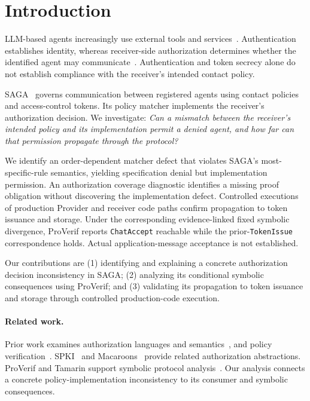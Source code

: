 \section{Introduction}
\label{sec:introduction}

LLM-based agents increasingly use external tools and
services~\cite{wang2024agents,debenedetti2024agentdojo}.
Authentication establishes identity, whereas receiver-side
authorization determines whether the identified agent may
communicate~\cite{ellison1999spki}. Authentication and token
secrecy alone do not establish compliance with the receiver's
intended contact policy.

SAGA~\cite{syros2025saga} governs communication between
registered agents using contact policies and access-control
tokens. Its policy matcher implements the receiver's
authorization decision. We investigate:
\emph{Can a mismatch between the receiver's intended policy
and its implementation permit a denied agent, and how far
can that permission propagate through the protocol?}

We identify an order-dependent matcher defect that violates
SAGA's most-specific-rule semantics, yielding specification
denial but implementation permission. An authorization
coverage diagnostic identifies a missing proof obligation
without discovering the implementation defect. Controlled
executions of production Provider and receiver code paths
confirm propagation to token issuance and storage.
Under the corresponding evidence-linked fixed symbolic
divergence, ProVerif reports \texttt{ChatAccept} reachable
while the prior-\texttt{TokenIssue} correspondence holds.
Actual application-message acceptance is not established.

Our contributions are (1) identifying and explaining a
concrete authorization decision inconsistency in SAGA;
(2) analyzing its conditional symbolic consequences using
ProVerif; and (3) validating its propagation to token
issuance and storage through controlled production-code
execution.

\paragraph{Related work.}
Prior work examines authorization languages and
semantics~\cite{becker2004cassandra,becker2007secpal},
and policy verification~\cite{fisler2005margrave}.
SPKI~\cite{ellison1999spki} and
Macaroons~\cite{birgisson2014macaroons} provide related
authorization abstractions. ProVerif and Tamarin support
symbolic protocol analysis~\cite{blanchet2016proverif,meier2013tamarin}.
Our analysis connects a concrete policy-implementation
inconsistency to its consumer and symbolic consequences.
